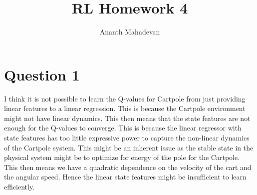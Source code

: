 \documentclass[a4paper]{article}
\title{RL Homework 4}
\author{Ananth Mahadevan}
\begin{document}
\maketitle
\clearpage


\section*{Question 1}
I think it is not possible to learn the Q-values for Cartpole from just providing linear features to a linear regression. This is because the Cartpole environment might not have linear dynamics. This then means that the state features are not enough for the Q-values to converge. This is because the linear regressor with state features has too little expressive power to capture the non-linear dynamics of the Cartpole system. This might be an inherent issue as the stable state in the physical system might be to optimize for energy of the pole for the Cartpole. This then means we have a quadratic dependence on the velocity of the cart and the angular speed. Hence the linear state features might be insufficient to learn efficiently.
\end{document}
